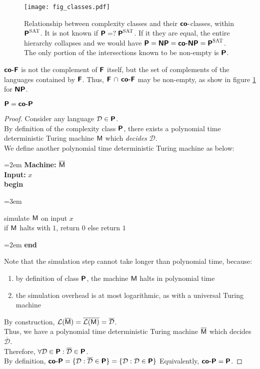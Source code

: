 \documentclass[usletter]{article}
\newcommand{\collection}[1]
           {\ensuremath{\mathcal{#1}}}
\newcommand{\namedcollection}[1]
           {\ensuremath{\textnormal{\textsc{#1}}}}
\newcommand{\machine}[1]
           {\ensuremath{\textnormal{\textsf{#1}}}}
\newcommand{\family}[1]
           {\ensuremath{\textnormal{\textsf{\textbf{#1}}}}}
\newenvironment{turing}[2]{
  \par\smallskip\leftskip=2em
  \noindent\ignorespaces
  \textbf{Machine:} #1\\
  \textbf{Input:} #2\\[5pt]
  \textbf{begin}
  \par\leftskip=3em
  \noindent\ignorespaces
}{
  \par\leftskip=2em
  \noindent\ignorespaces
  \textbf{end}
  \par\medskip
}
\begin{document}
\begin{figure}[h]
\centering
\graphicspath{{include/fig_classes/}}
\texttt{[image: fig\_classes.pdf]}
\caption{Relationship between complexity classes and their \family{co-}classes, within $\family{P}^\namedcollection{SAT}$. It is not known if $\family{P} =?\; \family{P}^\namedcollection{SAT}$. If it they are equal, the entire hierarchy collapses and we would have $\family{P} = \family{NP} = \family{co-NP} = \family{P}^\namedcollection{SAT}$. The only portion of the intersections known to be non-empty is \family{P}.}
\label{classes_fig}
\end{figure}

\begin{remark}
\family{co-F} is not the complement of \family{F} itself, but the set of complements of the languages contained by \family{F}. Thus, $\family{F} \,\cap\, \family{co-F}$ may be non-empty, as show in figure \ref{classes_fig} for \family{NP}.
\end{remark}

\begin{proposition}
$\family{P} = \family{co-P}$
\end{proposition}

\begin{proof}
Consider any language $\collection{D} \in \family{P}$. \\
By definition of the complexity class \family{P}, there exists a polynomial time deterministic Turing machine \machine{M} which \textit{decides} \collection{D}. \\

\noindent
We define another polynomial time deterministic Turing machine as below:
\begin{turing}{$\overline{\machine{M}}$}{$x$}
  simulate \machine{M} on input $x$ \\
  if \machine{M} halts with $1$, return $0$ else return $1$
\end{turing}

\noindent
Note that the simulation step cannot take longer than polynomial time, because:
\begin{enumerate}
  \item by definition of class \family{P}, the machine \machine{M} halts in polynomial time
  \item the simulation overhead is at most logarithmic, as with a universal Turing machine
\end{enumerate}

\noindent
By construction, $\collection{L}(\overline{\machine{M}}) = \overline{\collection{L}(\machine{M})} = \overline{\collection{D}}$. \\
Thus, we have a polynomial time deterministic Turing machine $\overline{\machine{M}}$ which decides $\overline{\collection{D}}$. \\

\noindent
Therefore, $\forall \collection{D} \in \family{P} : \overline{\collection{D}} \in \family{P}$. \\
By definition, $\family{co-P} = \{\collection{D} : \overline{\collection{D}} \in \family{P} \} = \{\collection{D} : \collection{D} \in \family{P} \}$ Equivalently, $\family{co-P} = \family{P}$.
\end{proof}
\end{document}
